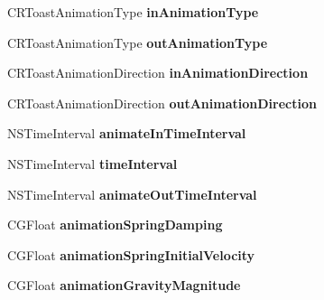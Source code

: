 \begin{DoxyCompactItemize}
\item 
\hypertarget{interface_c_r_toast_aa4140ff75712f7a24bc4e6fc6b349a01}{}C\+R\+Toast\+Animation\+Type {\bfseries in\+Animation\+Type}\label{interface_c_r_toast_aa4140ff75712f7a24bc4e6fc6b349a01}

\item 
\hypertarget{interface_c_r_toast_a53bd5fad8684f351fe3ccc86337086ef}{}C\+R\+Toast\+Animation\+Type {\bfseries out\+Animation\+Type}\label{interface_c_r_toast_a53bd5fad8684f351fe3ccc86337086ef}

\item 
\hypertarget{interface_c_r_toast_a793257c1d0aa91956d5d2eeb73d00898}{}C\+R\+Toast\+Animation\+Direction {\bfseries in\+Animation\+Direction}\label{interface_c_r_toast_a793257c1d0aa91956d5d2eeb73d00898}

\item 
\hypertarget{interface_c_r_toast_af4d19c70f26f9a14161383a51b60a82d}{}C\+R\+Toast\+Animation\+Direction {\bfseries out\+Animation\+Direction}\label{interface_c_r_toast_af4d19c70f26f9a14161383a51b60a82d}

\item 
\hypertarget{interface_c_r_toast_af44776241b61aa47734f7f7ae9133a9f}{}N\+S\+Time\+Interval {\bfseries animate\+In\+Time\+Interval}\label{interface_c_r_toast_af44776241b61aa47734f7f7ae9133a9f}

\item 
\hypertarget{interface_c_r_toast_a811aec27eb09b0469cfd19132ae6d389}{}N\+S\+Time\+Interval {\bfseries time\+Interval}\label{interface_c_r_toast_a811aec27eb09b0469cfd19132ae6d389}

\item 
\hypertarget{interface_c_r_toast_a5fdb4d44844878e7062ba1042ee46812}{}N\+S\+Time\+Interval {\bfseries animate\+Out\+Time\+Interval}\label{interface_c_r_toast_a5fdb4d44844878e7062ba1042ee46812}

\item 
\hypertarget{interface_c_r_toast_a00c04948e1afbd83fba5001c8fa354e1}{}C\+G\+Float {\bfseries animation\+Spring\+Damping}\label{interface_c_r_toast_a00c04948e1afbd83fba5001c8fa354e1}

\item 
\hypertarget{interface_c_r_toast_a47d19d22362b321cd64c23669716a5ce}{}C\+G\+Float {\bfseries animation\+Spring\+Initial\+Velocity}\label{interface_c_r_toast_a47d19d22362b321cd64c23669716a5ce}

\item 
\hypertarget{interface_c_r_toast_a48e6b3cef3e901f4bda196391e60e517}{}C\+G\+Float {\bfseries animation\+Gravity\+Magnitude}\label{interface_c_r_toast_a48e6b3cef3e901f4bda196391e60e517}


\end{DoxyCompactItemize}
